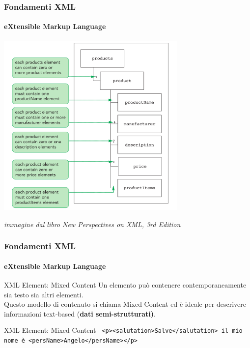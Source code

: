 
\begin{frame}
	\frametitle{Fondamenti XML}
	\framesubtitle{eXtensible Markup Language}
	\addtocounter{nframe}{1}

	\begin{center}
		
		\includegraphics[width=0.7\textwidth]{imgs/xml-parent-child-quantifier2.png}
	\end{center}
\begin{tiny}\textit{immagine dal libro New Perspectives on XML, 3rd Edition}\end{tiny}
\end{frame}


\begin{frame}
    \frametitle{Fondamenti XML}
    \framesubtitle{eXtensible Markup Language}
    \addtocounter{nframe}{1}

	\begin{block}{XML Element: Mixed Content}
		Un elemento può contenere contemporaneamente sia testo sia altri elementi. 
		\\Questo modello di contenuto si chiama Mixed Content ed è ideale per descrivere informazioni text-based (\textbf{dati semi-strutturati)}.
	\end{block}

	\begin{block}{XML Element: Mixed Content}
		\texttt{
			<p><salutation>Salve</salutation> il mio nome è <persName>Angelo</persName></p>
			} 
	\end{block}


\end{frame}

